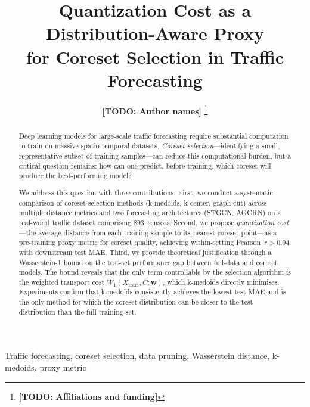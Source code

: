 \documentclass[journal]{IEEEtran}
\newcommand{\Wone}{W_1}
\newcommand{\Xtrain}{X_{\mathrm{train}}}
\newcommand{\todo}[1]{{\color{red}\textbf{[TODO: #1]}}}
\begin{document}
\title{Quantization Cost as a Distribution-Aware Proxy \\
for Coreset Selection in Traffic Forecasting}

\author{
  \todo{Author names}
  \thanks{\todo{Affiliations and funding}}
}

\maketitle

\begin{abstract}
Deep learning models for large-scale traffic forecasting require
substantial computation to train on massive spatio-temporal datasets.
\emph{Coreset selection}---identifying a small, representative subset
of training samples---can reduce this computational burden, but a
critical question remains: how can one predict, before training,
which coreset will produce the best-performing model?

We address this question with three contributions.
First, we conduct a systematic comparison of coreset selection methods
(k-medoids, k-center, graph-cut) across multiple distance metrics and
two forecasting architectures (STGCN, AGCRN) on a real-world traffic
dataset comprising 893~sensors.
Second, we propose \emph{quantization cost}---the average distance
from each training sample to its nearest coreset point---as a
pre-training proxy metric for coreset quality, achieving
within-setting Pearson~$r > 0.94$ with downstream test MAE.
Third, we provide theoretical justification through a Wasserstein-1
bound on the test-set performance gap between full-data and coreset
models.
The bound reveals that the only term controllable by the selection
algorithm is the weighted transport cost
$\Wone(\Xtrain, C; \mathbf{w})$, which k-medoids directly minimises.
Experiments confirm that k-medoids consistently achieves the lowest
test MAE and is the only method for which the coreset distribution
can be closer to the test distribution than the full training set.
\end{abstract}

\begin{IEEEkeywords}
Traffic forecasting, coreset selection, data pruning,
Wasserstein distance, k-medoids, proxy metric
\end{IEEEkeywords}
\end{document}
